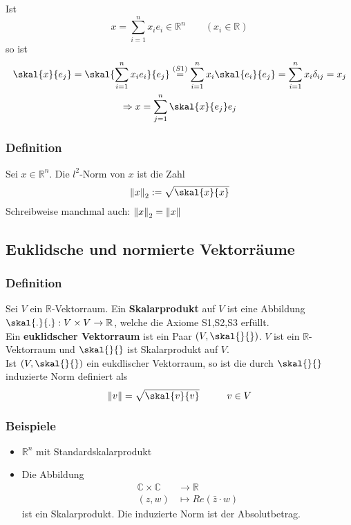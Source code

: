 Ist \[
	x=\sum_{i=1}^{n}x_ie_i \in \mathbb{R}^n \qquad (x_i \in \mathbb{R})
	\]
so ist \begin{gather*}
	\skal{x}{e_j} = \skal{\sum_{i=1}^{n}x_ie_i}{e_j} \stackrel{(S1)}{=} \sum_{i=1}^{n}x_i \skal{e_i}{e_j} = \sum^{n}_{i=1}x_i \delta_{ij} = x_j \\
	\Rightarrow x = \sum^{n}_{j=1} \skal{x}{e_j}e_j
\end{gather*}

\subsubsection{Definition} %
\label{ssub:definition}
Sei $x \in \mathbb{R}^n$. Die $l^2$-Norm von $x$ ist die Zahl
\[
	\norm{x}_2:= \sqrt{\skal{x}{x}} 
\]
Schreibweise manchmal auch: $\norm{x}_2 = \norm{x}$

\subsection{Euklidsche und normierte Vektorräume} %
\label{sub:euklidsche_und_normierte_vektorraume}

\subsubsection{Definition} %
\label{ssub:definition}
Sei $ V$  ein $\mathbb{R}$-Vektorraum. Ein {\bfseries Skalarprodukt} auf $ V$  ist eine Abbildung $\skal{.}{.}:V \times V \to \mathbb{R}$, welche die Axiome S1,S2,S3 erfüllt. \\
Ein {\bfseries euklidscher Vektorraum} ist ein Paar $(V,\skal{}{})$. $ V$  ist ein $\mathbb{R}$-Vektorraum und $\skal{}{}$ ist Skalarprodukt auf $ V$. \\
Ist $(V,\skal{}{})$ ein eukdlischer Vektorraum, so ist die durch $\skal{}{}$ induzierte Norm definiert als \[
	\norm{v}=\sqrt{\skal{v}{v}} \hspace{1cm}  v \in V 
	\]

\subsubsection{Beispiele} %
\label{ssub:beispiele}

\begin{itemize}
	\item $\mathbb{R}^n$ mit Standardskalarprodukt
	\item Die Abbildung \begin{align*}
		 \mathbb{C} \times \mathbb{C} &\to \mathbb{R} \\
		 (z,w) &\mapsto Re(\bar z \cdot w)
		 \end{align*}
		 ist ein Skalarprodukt. Die induzierte Norm ist der Absolutbetrag.      
\end{itemize}

